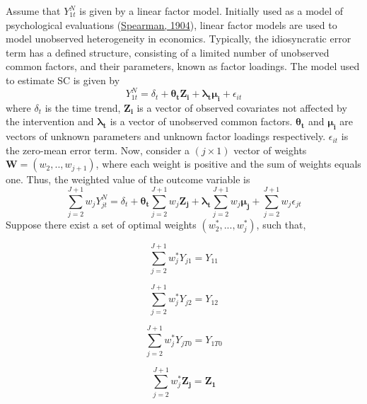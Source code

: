 \documentclass[12pt,nobind, a4paper]{reedthesis}
\begin{document}
 Assume that \(Y^{N}_{1t}\) is given by a linear factor model. Initially used as a model of psychological evaluations (\protect\hyperlink{ref-spearman_general_1904}{Spearman, 1904}), linear factor models are used to model unobserved heterogeneity in economics. Typically, the idiosyncratic error term has a defined structure, consisting of a limited number of unobserved common factors, and their parameters, known as factor loadings. The model used to estimate SC is given by
 \begin{equation}
 Y^{N}_{1t}= \delta_{t}+\mathbf{\theta_{t} Z_{i}}+\mathbf{\lambda_{t} \mu_{i}}+ \epsilon_{it}
 \label{eq:eq4}
 \end{equation}
 where \(\delta_{t}\) is the time trend, \(\mathbf{Z_{i}}\) is a vector of observed covariates not affected by the intervention and \(\mathbf{ \lambda_{t}}\) is a vector of unobserved common factors. \(\mathbf{\theta_{t}}\) and \(\mathbf{\mu_{i}}\) are vectors of unknown parameters and unknown factor loadings respectively. \(\epsilon_{it}\) is the zero-mean error term. Now, consider a \((j\times 1)\) vector of weights \(\mathbf{W}=(w_{2},..,w_{j+1})\), where each weight is positive and the sum of weights equals one. Thus, the weighted value of the outcome variable is
 \begin{equation}
 \sum_{j=2}^{J+1}w_{j}Y^{N}_{jt}= \delta_{t}+
 \mathbf{\theta_{t}} \sum_{j=2}^{J+1}w_{j}\mathbf{Z_{j}}+
 \mathbf{\lambda_{t}} \sum_{j=2}^{J+1}w_{j}\mathbf{\mu_{j}}+ \sum_{j=2}^{J+1}w_{j}\epsilon_{jt}
 \label{eq:eq5}
 \end{equation}
 Suppose there exist a set of optimal weights \((w_{2}^{*},...,w_{j}^{*})\), such that,

 \[\sum_{j=2}^{J+1}w_{j}^{*}Y_{j1}=Y_{11}\]

 \[ \sum_{j=2}^{J+1}w_{j}^{*}Y_{j2}=Y_{12}\]

 \[\sum_{j=2}^{J+1}w_{j}^{*}Y_{jT0}=Y_{1T0} \]

 \[\sum_{j=2}^{J+1}w_{j}^{*} \mathbf{Z_{j}}=\mathbf{Z_{1}}\]
\end{document}
